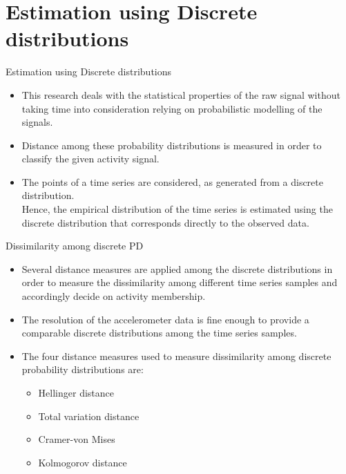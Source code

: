 \documentclass{beamer}
\begin{document}
\section{Estimation using Discrete distributions}
\begin{frame}{Estimation using Discrete distributions}
\begin{itemize}
    \item This research deals with the statistical properties of the raw signal without taking time into consideration relying on probabilistic modelling of the signals.
    \item Distance among these probability distributions is measured in order to classify the given activity signal.
    \item The points of a time series are considered, as generated from a discrete distribution.\\
    Hence, the empirical distribution of the time series is estimated using the discrete distribution that corresponds directly to the observed data.
\end{itemize}
\end{frame}
\begin{frame}{Dissimilarity among discrete PD}
    \begin{itemize}
    \item Several distance measures are applied among the discrete distributions in order to measure the dissimilarity among different time series samples and accordingly decide on activity membership.
    \item The resolution of the accelerometer data is fine enough to provide a comparable discrete distributions among the time series samples.
    \item The four distance measures used to measure dissimilarity among discrete probability distributions are:
    \begin{itemize}
        \item Hellinger distance 
        \item Total variation distance
        \item Cramer-von Mises
        \item Kolmogorov distance
    \end{itemize}
    \end{itemize}
\end{frame}
\end{document}
